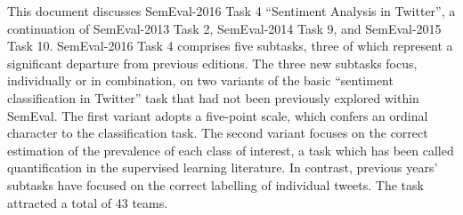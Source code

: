 This document discusses SemEval-2016 Task 4 ``Sentiment Analysis in Twitter'', a continuation of SemEval-2013 Task 2, SemEval-2014 Task 9, and SemEval-2015 Task 10. SemEval-2016 Task 4 comprises five subtasks, three of which represent a significant departure from previous editions. The three new subtasks focus, individually or in combination, on two variants of the basic ``sentiment classification in Twitter'' task that had not been previously explored within SemEval. The first variant adopts a five-point scale, which confers an ordinal character to the classification task. The second variant focuses on the correct estimation of the prevalence of each class of interest, a task which has been called quantification in the supervised learning literature. In contrast, previous years' subtasks have focused on the correct labelling of individual tweets. The task attracted a total of 43 teams.
